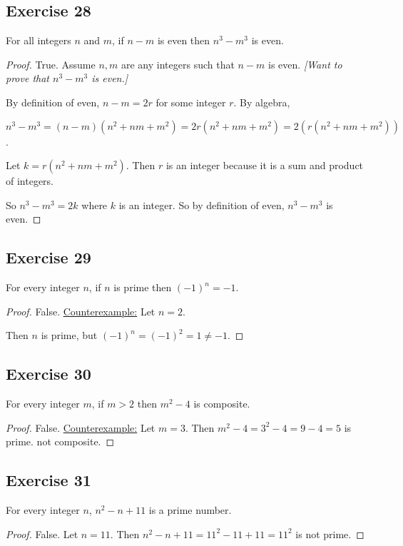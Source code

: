\documentclass[14pt]{extarticle}
\begin{document}
\subsection{Exercise 28}
For all integers $n$ and $m$, if $n - m$ is even then $n^3 - m^3$ is even.

\begin{proof}
True. Assume $n, m$ are any integers such that $n - m$ is even. {\it [Want to prove that $n^3 - m^3$ is even.]}

By definition of even, $n-m = 2r$ for some integer $r$. By algebra, 

$n^3 - m^3 = (n-m)(n^2 + nm + m^2) = 2r(n^2 + nm + m^2) = 2(r(n^2 + nm + m^2))$.

Let $k = r(n^2 + nm + m^2)$. Then $r$ is an integer because it is a sum and product of integers.

So $n^3 - m^3 = 2k$ where $k$ is an integer. So by definition of even, $n^3 - m^3$ is even.
\end{proof}

\subsection{Exercise 29}
For every integer $n$, if $n$ is prime then $(-1)^n = -1$.

\begin{proof}
False. \underline{Counterexample:} Let $n=2$. 

Then $n$ is prime, but $(-1)^n = (-1)^2 = 1 \neq -1$.
\end{proof}

\subsection{Exercise 30}
For every integer $m$, if $m > 2$ then $m^2 - 4$ is composite.

\begin{proof}
False. \underline{Counterexample:} Let $m = 3$. Then $m^2 - 4 = 3^2 - 4 = 9 - 4 = 5$ is prime. not composite.
\end{proof}

\subsection{Exercise 31}
For every integer $n$, $n^2 - n + 11$ is a prime number.

\begin{proof}
False. Let $n = 11$. Then $n^2 - n + 11 = 11^2 - 11 + 11 = 11^2$ is not prime.
\end{proof}
\end{document}
